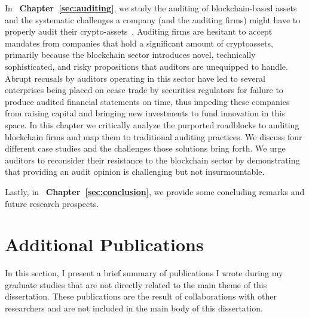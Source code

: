 In ~\textbf{Chapter~\ref{sec:auditing}}, we study the auditing of blockchain-based assets and the systematic challenges a company (and the auditing firms) might have to properly audit their crypto-assets~\cite{pimentel2021systemizing}. Auditing firms are hesitant to accept mandates from companies that hold a significant amount of cryptoassets, primarily because the blockchain sector introduces novel, technically sophisticated, and risky propositions that auditors are unequipped to handle. Abrupt recusals by auditors operating in this sector have led to several enterprises being placed on cease trade by securities regulators for failure to produce audited financial statements on time, thus impeding these companies from raising capital and bringing new investments to fund innovation in this space. In this chapter we critically analyze the purported roadblocks to auditing blockchain firms and map them to traditional auditing practices. We discuss four different case studies and the challenges those solutions bring forth. We urge auditors to reconsider their resistance to the blockchain sector by demonstrating that providing an audit opinion is challenging but not insurmountable.

Lastly, in ~\textbf{Chapter~\ref{sec:conclusion}}, we provide some concluding remarks and future research prospects.

\section{Additional Publications}
In this section, I present a brief summary of publications I wrote during my graduate studies that are not directly related to the main theme of this dissertation. These publications are the result of collaborations with other researchers and are not included in the main body of this dissertation.

